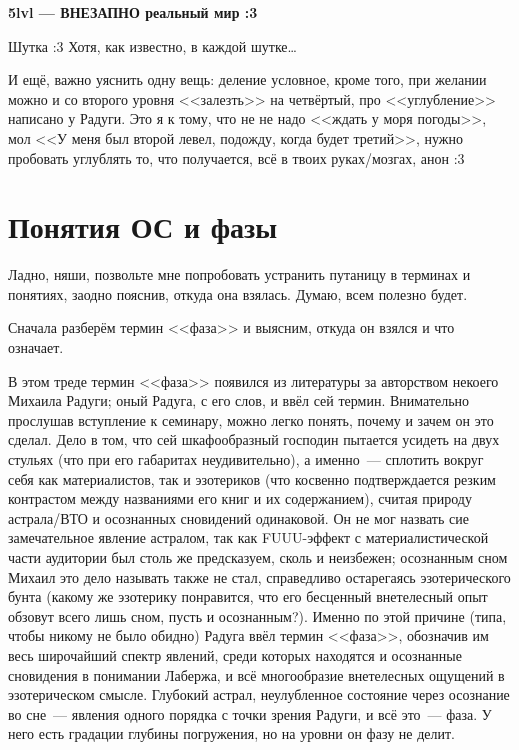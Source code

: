 \documentclass[a4paper,14pt,oneside]{memoir}
\begin{document}
\clearpage

\begin{center}
\textbf{5lvl — ВНЕЗАПНО реальный мир :3}
\end{center}


Шутка :3 Хотя, как известно, в каждой шутке\ldots
\medskip

И ещё, важно уяснить одну вещь: деление условное, кроме того, при желании можно и со второго  уровня <<залезть>> на четвёртый, про <<углубление>> написано у Радуги. Это я к тому, что не не надо <<ждать у моря погоды>>, мол <<У меня был второй левел, подожду, когда будет третий>>, нужно пробовать углублять то, что получается, всё в твоих руках/мозгах, анон :3



\section{Понятия ОС и фазы}


Ладно, няши, позвольте мне попробовать устранить путаницу в терминах и понятиях, заодно пояснив, откуда она взялась. Думаю, всем полезно будет. 

Сначала разберём термин <<фаза>> и выясним, откуда он взялся и что означает.

В этом треде термин <<фаза>> появился из литературы за авторством некоего Михаила Радуги; оный Радуга, с его слов, и ввёл сей термин. Внимательно прослушав вступление к семинару, можно легко понять, почему и зачем он это сделал. Дело в том, что сей шкафообразный господин пытается усидеть на двух стульях (что при его габаритах неудивительно), а именно~--- сплотить вокруг себя как материалистов, так и эзотериков (что косвенно подтверждается резким контрастом между названиями его книг и их содержанием), считая природу астрала/ВТО и осознанных сновидений одинаковой. Он не мог назвать сие замечательное явление астралом, так как FUUU-эффект с материалистической части аудитории был столь же предсказуем, сколь и неизбежен; осознанным сном Михаил это дело называть также не стал, справедливо остарегаясь эзотерического бунта (какому же эзотерику понравится, что его бесценный внетелесный опыт обзовут всего лишь сном, пусть и осознанным?). Именно по этой причине (типа, чтобы никому не было обидно) Радуга ввёл термин <<фаза>>, обозначив им весь широчайший спектр явлений, среди которых находятся и осознанные сновидения в понимании Лабержа, и всё многообразие внетелесных ощущений в эзотерическом смысле. Глубокий астрал, неулубленное состояние через осознание во сне~--- явления одного порядка с точки зрения Радуги, и всё это~--- фаза. У него есть градации глубины погружения, но на уровни он фазу не делит.
\end{document}
